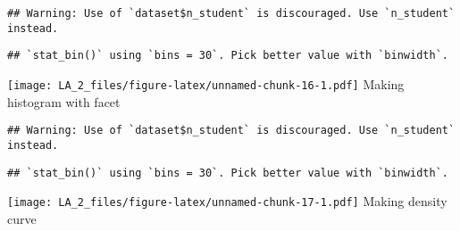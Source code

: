 \documentclass[
]{article}
\newenvironment{Shaded}{\begin{snugshade}}{\end{snugshade}}
\newcommand{\AttributeTok}[1]{\textcolor[rgb]{0.77,0.63,0.00}{#1}}
\newcommand{\FunctionTok}[1]{\textcolor[rgb]{0.00,0.00,0.00}{#1}}
\newcommand{\NormalTok}[1]{#1}
\newcommand{\SpecialCharTok}[1]{\textcolor[rgb]{0.00,0.00,0.00}{#1}}
\begin{document}
\begin{Shaded}
\end{Shaded}

\begin{verbatim}
## Warning: Use of `dataset$n_student` is discouraged. Use `n_student` instead.
\end{verbatim}

\begin{verbatim}
## `stat_bin()` using `bins = 30`. Pick better value with `binwidth`.
\end{verbatim}

\texttt{[image: LA\_2\_files/figure-latex/unnamed-chunk-16-1.pdf]} Making
histogram with facet

\begin{Shaded}
\end{Shaded}

\begin{verbatim}
## Warning: Use of `dataset$n_student` is discouraged. Use `n_student` instead.
\end{verbatim}

\begin{verbatim}
## `stat_bin()` using `bins = 30`. Pick better value with `binwidth`.
\end{verbatim}

\texttt{[image: LA\_2\_files/figure-latex/unnamed-chunk-17-1.pdf]} Making
density curve

\begin{Shaded}
\end{Shaded}
\end{document}
